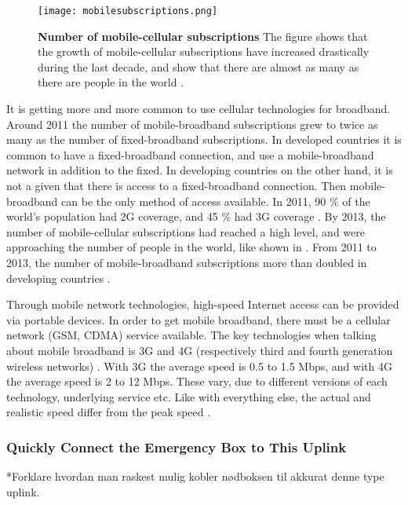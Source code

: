 \begin{figure}[b]
  \centering
      \texttt{[image: mobilesubscriptions.png]}
  \caption [Number of mobile-cellular subscriptions]{\textbf{Number of mobile-cellular subscriptions} The figure shows that the growth of mobile-cellular subscriptions have increased drastically during the last decade, and show that there are almost as many as there are people in the world \cite{itu2013}.}
  \label{fig:subscribers}
\end{figure}

It is getting more and more common to use cellular technologies for broadband. Around 2011 the number of mobile-broadband subscriptions grew to twice as many as the number of fixed-broadband subscriptions. In developed countries it is common to have a fixed-broadband connection, and use a mobile-broadband network in addition to the fixed. In developing countries on the other hand, it is not a given that there is access to a fixed-broadband connection. Then mobile-broadband can be the only method of access available. In 2011, 90 \% of the world's population had 2G coverage, and 45 \% had 3G coverage \cite{itu2011}. By 2013, the number of mobile-cellular subscriptions had reached a high level, and were approaching the number of people in the world, like shown in . From 2011 to 2013, the number of mobile-broadband  subscriptions more than doubled in developing countries \cite{itu2013}. 

Through mobile network technologies, high-speed Internet access can be provided via portable devices. In order to get mobile broadband, there must be a cellular network (GSM, CDMA) service available. The key technologies when talking about mobile broadband is 3G and 4G (respectively third and fourth generation wireless networks) \cite{mobilebroadband}. With 3G the average speed is 0.5 to 1.5 Mbps, and with 4G the average speed is 2 to 12 Mbps. These vary, due to different versions of each technology, underlying service etc. Like with everything else, the actual and realistic speed differ from the peak speed \cite{3gvs4g}. 

\subsubsection{Quickly Connect the Emergency Box to This Uplink}
*Forklare hvordan man raskest mulig kobler nødboksen til akkurat denne type uplink.



